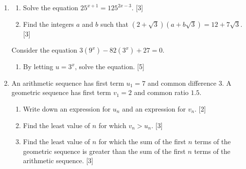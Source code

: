 \documentclass[12pt, twoside]{article}
\begin{document}
\begin{enumerate}[itemsep=0.15cm]
\newpage

\item[3.] [Maximum mark: 11]

\begin{enumerate}[itemsep=0.1cm]
  \item Solve the equation $25^{x + 1} = 125^{2x - 3}$. \hfill [3]
  \item Find the integers $a$ and $b$ such that
  $\left(2 + \sqrt{3}\right)\left(a + b\sqrt{3}\right) = 12 + 7\sqrt{3}$.
  \hfill [3]
\end{enumerate}

Consider the equation $3\left(9^{x}\right) - 82\left(3^{x}\right) + 27 = 0$.

\begin{enumerate}[itemsep=0.1cm]
  \item[(c)] By letting $u = 3^{x}$, solve the equation. \hfill [5]
\end{enumerate}


\newpage

\item[4.] [Maximum mark: 8]

An arithmetic sequence has first term $u_{1} = 7$ and common difference
$3$. A geometric sequence has first term $v_{1} = 2$ and common ratio
$1.5$.

\begin{enumerate}[itemsep=0.1cm]
  \item Write down an expression for $u_{n}$ and an expression for $v_{n}$.
  \hfill [2]
  \item Find the least value of $n$ for which $v_{n} > u_{n}$. \hfill [3]
  \item Find the least value of $n$ for which the sum of the first $n$ terms
  of the geometric sequence is greater than the sum of the first $n$ terms
  of the arithmetic sequence. \hfill [3]
\end{enumerate}


\end{enumerate}
\end{document}
